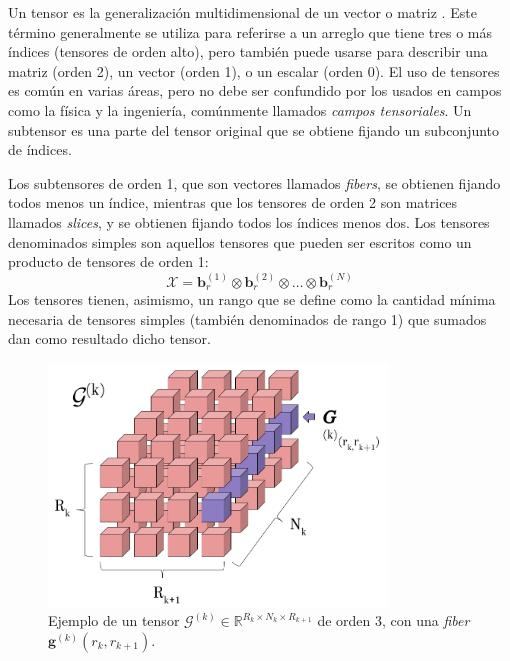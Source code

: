 \documentclass[spanish]{article}
\theoremstyle{definition}
\theoremstyle{remark}
\numberwithin{equation}{section}
\numberwithin{equation}{section} %
\begin{document}
\clearpage
 
 
Un tensor es la generalización multidimensional de un vector o matriz \cite{kolda2009tensor}. Este término generalmente se utiliza para referirse a un arreglo que tiene tres o más índices (tensores de orden alto), pero también puede usarse para describir una matriz (orden 2), un vector (orden 1), o un escalar (orden 0). El uso de tensores es común en varias áreas, pero no debe ser confundido por los usados en campos como la física y la ingeniería, comúnmente llamados \textit{campos tensoriales}. Un subtensor es una parte del tensor original que se obtiene fijando un subconjunto de índices.
\par
Los subtensores de orden 1, que son vectores llamados \textit{fibers}, se obtienen fijando todos menos un índice, mientras que los tensores de orden 2 son matrices llamados \textit{slices}, y se obtienen fijando todos los índices menos dos. Los tensores denominados simples son aquellos tensores que pueden ser escritos como un producto de tensores de orden 1:
\begin{equation}
\label{eq_simple}
\mathcal{X}= \boldsymbol{b}_{r}^{(1)} \otimes	 \boldsymbol{b}_{r}^{(2)} \otimes	  \ldots  \otimes	 \boldsymbol{b}_{r}^{(N)}   
\end{equation}
Los tensores tienen, asimismo, un rango que se define como la cantidad mínima necesaria de tensores simples (también denominados de rango 1) que sumados dan como resultado dicho tensor.    
\begin{figure}[H]
 \centering
 \includegraphics[width=9cm]{img/ejemplo_tensor_fiber_3d.png}
\caption[Ejemplo \textit{fiber} en un tensor]{\footnotesize{ Ejemplo de un tensor $\mathcal{G}^{(k)} \in \mathbb{R}^{R_k \times N_k \times R_{k+1}}$ de orden 3, con una \textit{fiber} $\boldsymbol{g}^{(k)}(r_k,r_{k+1})$.}}

\label{fig:fiber_in_tensor}
\end{figure}\par
\end{document}
